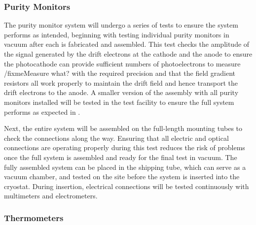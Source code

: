 
\subsubsection{Purity Monitors}
\label{sec:fdgen-slow-cryo-qc-pm}

The purity monitor system will undergo a series of tests to ensure the system performs as intended,  beginning with testing individual purity monitors in vacuum after each is fabricated and assembled.  This test checks the amplitude of the signal generated by the drift electrons at the cathode and the anode to ensure the photocathode can provide sufficient numbers of photoelectrons to measure /fixme{Measure what?} %
with the required precision and that the field gradient resistors all work properly to maintain the drift field and hence transport the drift electrons to the anode.  A smaller version of the assembly with all purity monitors installed will be  tested in the \lar test facility to ensure the full system performs as expected in \lar.  

Next, %
the entire system will be assembled on the full-length mounting tubes to check the connections along the way.  Ensuring that all electric and optical connections are operating properly during this test reduces the risk of problems once the full system is assembled and ready for the final test in vacuum.  %
The fully assembled system can be placed in the shipping tube, which can serve as a vacuum chamber, and tested on the  site before the system is inserted into the    cryostat. During insertion, electrical connections will be tested continuously with multimeters and electrometers. %



\subsubsection{Thermometers}
\label{sec:fdgen-slow-cryo-qc-th}

